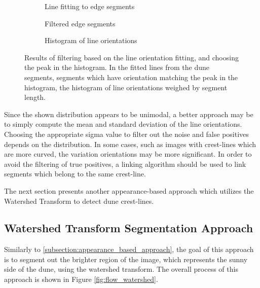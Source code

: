   \begin{figure}
  	\centering
  	\begin{subfigure}{0.48\textwidth}
  		\centering
  		\caption{Line fitting to edge segments}
  		\label{fig:filtered_edges_lines}
  	\end{subfigure}
  	\begin{subfigure}{0.48\textwidth}
  		\centering
  		\caption{Filtered edge segments}
  		\label{fig:filtered_edges}
  	\end{subfigure}
  	\begin{subfigure}{\textwidth}
  		\centering
  		\caption{Histogram of line orientations}
  		\label{fig:linehistogram}
  	\end{subfigure}
  	\caption{Results of filtering based on the line orientation fitting, and choosing the peak in the histogram. In   the fitted lines from the dune segments,  segments which have orientation matching the peak in the histogram,   the histogram of line orientations weighed by segment length. }
  	\label{fig:dune_segment_linking_line_fitting}
  \end{figure}
  
Since the shown distribution appears to be unimodal, a better approach may be to simply compute the mean and standard deviation of the line orientations. Choosing the appropriate sigma value to filter out the noise and false positives depends on the distribution. In some cases, such as images with crest-lines which are more curved, the variation orientations may be more significant. In order to avoid the filtering of true positives, a linking algorithm should be used to link segments which belong to the same crest-line.

The next section presents another appearance-based approach which utilizes the Watershed Transform to detect dune crest-lines.

\subsection{Watershed Transform Segmentation Approach} \label{subsec:watershed_transform_segmentation_approach}

Similarly to \ref{subsection:appearance_based_approach}, the goal of this approach is to segment out the brighter region of the image, which represents the sunny side of the dune, using the watershed transform. The overall process of this approach is shown in Figure \ref{fig:flow_watershed}.

